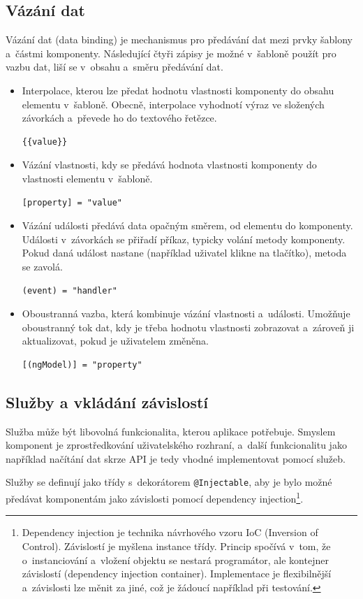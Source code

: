 \documentclass[
  digital, %
  oneside, %
  table,   %
  nolof,     %
  nolot,     %
  nocover
]{fithesis3}
\begin{document}
\subsection{Vázání dat}
Vázání dat (data binding) je mechanismus pro předávání dat mezi prvky šablony a~částmi komponenty. Následující čtyři zápisy je možné v~šabloně použít pro vazbu dat, liší se v~obsahu a~směru předávání dat. \cite{angulario}
\begin{itemize}
  \item Interpolace, kterou lze předat hodnotu vlastnosti komponenty do obsahu elementu v~šabloně. Obecně, interpolace vyhodnotí výraz ve složených závorkách a~převede ho do textového řetězce.
\begin{lstlisting}[showstringspaces=false]
{{value}}
\end{lstlisting}
  \item Vázání vlastnosti, kdy se předává hodnota vlastnosti komponenty do vlastnosti elementu v~šabloně.
  \begin{lstlisting}[showstringspaces=false]
[property] = "value"
\end{lstlisting}
  \item Vázání události předává data opačným směrem, od elementu do komponenty. Události v~závorkách se přiřadí příkaz, typicky volání metody komponenty. Pokud daná událost nastane (například uživatel klikne na tlačítko), metoda se zavolá.
\begin{lstlisting}[showstringspaces=false]
(event) = "handler"
\end{lstlisting}
  \item Oboustranná vazba, která kombinuje vázání vlastnosti a~události. Umožňuje oboustranný tok dat, kdy je třeba hodnotu vlastnosti zobrazovat a~zároveň ji aktualizovat, pokud je uživatelem změněna.
\begin{lstlisting}[showstringspaces=false]
[(ngModel)] = "property"
\end{lstlisting}
\end{itemize}

\subsection{Služby a vkládání závislostí}
Služba může být libovolná funkcionalita, kterou aplikace potřebuje. Smyslem komponent je zprostředkování uživatelského rozhraní, a~další funkcionalitu jako například načítání dat skrze API je tedy vhodné implementovat pomocí služeb. \cite{angulario}\par
Služby se definují jako třídy s~dekorátorem \verb|@Injectable|, aby je bylo možné předávat komponentám jako závislosti pomocí dependency injection\footnote{Dependency injection je technika návrhového vzoru IoC (Inversion of Control). Závislostí je myšlena instance třídy. Princip spočívá v~tom, že o~instanciování a~vložení objektu se nestará programátor, ale kontejner závislostí (dependency injection container). Implementace je flexibilnější a~závislosti lze měnit za jiné, což je žádoucí například při testování.}.
\end{document}
